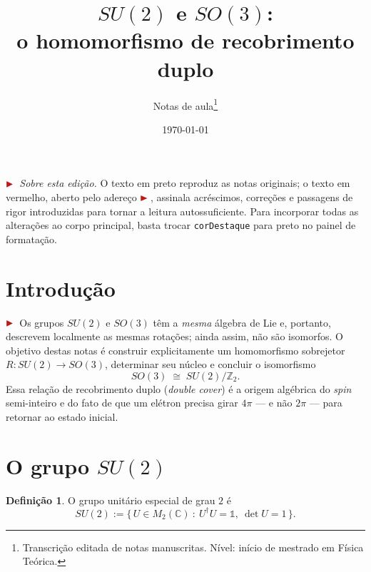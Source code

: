 \documentclass[12pt,a4paper]{article}
\title{\textbf{$SU(2)$ e $SO(3)$:\\[2pt] o homomorfismo de recobrimento duplo}}
\author{Notas de aula\thanks{Transcrição editada de notas manuscritas. Nível: início de mestrado em Física Teórica.}}
\date{\today}
\newcommand{\marcador}{\ensuremath{\color{corDestaque}\blacktriangleright}\,}
\newenvironment{nota}{\par\color{corDestaque}\noindent\marcador\ignorespaces}{\par}
\newcommand{\C}{\mathbb{C}}
\newcommand{\Z}{\mathbb{Z}}
\newcommand{\id}{\mathbb{1}}                 %
\newcommand{\dg}{\dagger}
\theoremstyle{definition}
\newtheorem{definicao}{Definição}
\theoremstyle{plain}
\theoremstyle{remark}
\begin{document}
\maketitle

\begin{nota}
\emph{Sobre esta edição.} O texto em preto reproduz as notas originais; o
texto em vermelho, aberto pelo adereço \marcador, assinala acréscimos,
correções e passagens de rigor introduzidas para tornar a leitura
autossuficiente. Para incorporar todas as alterações ao corpo principal,
basta trocar \texttt{corDestaque} para preto no painel de formatação.
\end{nota}

\section{Introdução}
\begin{nota}
Os grupos $SU(2)$ e $SO(3)$ têm a \emph{mesma} álgebra de Lie e, portanto,
descrevem localmente as mesmas rotações; ainda assim, não são isomorfos. O
objetivo destas notas é construir explicitamente um homomorfismo
sobrejetor $R:SU(2)\to SO(3)$, determinar seu núcleo e concluir o
isomorfismo
\[
  SO(3)\;\cong\;SU(2)/\Z_2 .
\]
Essa relação de recobrimento duplo (\emph{double cover}) é a origem
algébrica do \emph{spin} semi-inteiro e do fato de que um elétron precisa
girar $4\pi$ — e não $2\pi$ — para retornar ao estado inicial.
\end{nota}

\section{O grupo $SU(2)$}

\begin{definicao}
O grupo unitário especial de grau $2$ é
\[
  SU(2):=\bigl\{\,U\in M_2(\C)\ :\ U^{\dg}U=\id,\ \det U=1\,\bigr\}.
\]
\end{definicao}
\end{document}
